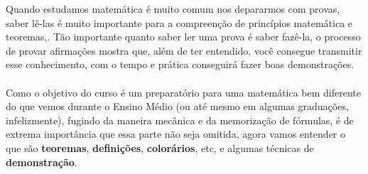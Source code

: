 \documentclass[main.tex]{subfiles}
\begin{document}
Quando estudamos matemática é muito comum nos depararmos com provas, saber lê-las é muito importante para a compreenção de princípios matemática e teoremas,. Tão importante quanto saber ler uma prova é saber fazê-la, o processo de provar afirmações mostra que, além de ter entendido, você consegue transmitir esse conhecimento, com o tempo e prática conseguirá fazer boas demonstrações.
\\
\\
Como o objetivo do curso é um preparatório para uma matemática bem diferente do que vemos durante o Ensino Médio (ou até mesmo em algumas graduações, infelizmente), fugindo da maneira mecânica e da memorização de fórmulas, é de extrema importância que essa parte não seja omitida, agora vamos entender o que são \textbf{teoremas}, \textbf{definições}, \textbf{colorários}, etc, e algumas técnicas de \textbf{demonstração}.
\end{document}
